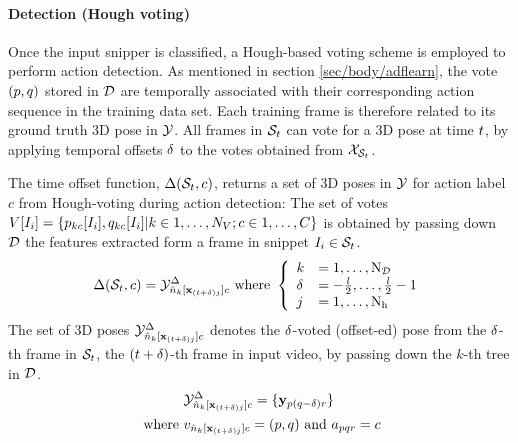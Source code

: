 \paragraph{Detection (Hough voting)}
Once the input snipper is classified, a Hough-based voting scheme is employed to perform action detection. 
As mentioned in section \ref{sec/body/adflearn}, the vote $(p,q)$ stored in $\mathcal{D}$ are temporally associated with their corresponding action sequence in the training data set. Each training frame is therefore related to its ground truth 3D pose in $\mathcal{Y}$. All frames in $\mathcal{S}_{t}$ can vote for a 3D pose at time $t$, by applying temporal offsets $\delta$ to the votes obtained from $\mathcal{X}_{\mathcal{S}_{t}}$. 

The time offset function, $\Delta(\mathcal{S}_{t},c)$, returns a set of 3D poses in $\mathcal{Y}$ for action label $c$ from Hough-voting during action detection: 
The set of votes $V[I_i] = \{ p_{k c}[I_{i}], q_{k c}[I_{i}]|k\in1,\dots,N_{V};c\in1,\dots,C\}$ is obtained by passing down $\mathcal{D}$ the features extracted form a frame in snippet $I_{i} \in \mathcal{S}_{t}$. 
\begin{equation} 
	\Delta(\mathcal{S}_{t}, c) = \mathcal{Y}^{\Delta}_{{\hat{n}}_{k}[\mathbf{x}_{(t+\delta)j}]c}
	\mbox{ where }  
	\left\{	
	\begin{array}{ll}
	k & = 1,\dots,\mathrm{N_{\mathcal{D}}} \\ 
	\delta & = -\frac{l}{2},\dots,\frac{l}{2}-1\\ 
	j & = 1,\dots,\mathrm{N_{h}}  
	\end{array} 
	\right.
\end{equation}
The set of 3D poses $\mathcal{Y}^{\Delta}_{{\hat{n}}_{k}[\mathbf{x}_{(t+\delta)j}]c}$ denotes the $\delta$-voted (offset-ed) pose from the $\delta$-th frame in $\mathcal{S}_{t}$, \ie the $(t + \delta)$-th frame in input video, by passing down the $k$-th tree in $\mathcal{D}$. 
\begin{equation}
	\begin{split}
		& \mathcal{Y}^{\Delta}_{{\hat{n}}_{k}[\mathbf{x}_{(t+\delta)j}]c} = \{\mathbf{y}_{p(q-\delta)r}\}\\ 
		\mbox{ where } & v_{{\hat{n}}_{k}[\mathbf{x}_{(t+\delta)j}]c} = (p, q) \mbox{ and } a_{pqr} = c 
\end{split} 
\end{equation} 
